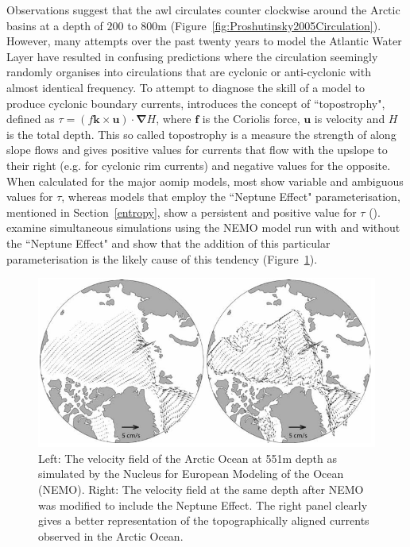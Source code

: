 \documentclass[12pt,a4paper]{report}
\newcommand*\figref[1]{Figure~\ref{#1}}
\newcommand*\secref[1]{Section~\ref{#1}}
\begin{document}
Observations suggest that the \gls{awl} circulates counter clockwise around the
 Arctic basins at a depth of $200$ to $800\mathrm{m}$
 (\figref{fig:Proshutinsky2005Circulation}). However, many attempts over the past twenty
 years to model the Atlantic Water Layer have resulted in confusing predictions where the
 circulation seemingly randomly organises into circulations that are cyclonic or
 anti-cyclonic with almost identical frequency. To attempt to diagnose the skill of a model
 to produce cyclonic boundary currents, \cite{holloway2007water} introduces the concept of ``topostrophy",
 defined as   $\tau=(f\boldsymbol{k}\times\boldsymbol{u})\cdot\boldsymbol{\nabla}H$, where
 $\boldsymbol{f}$  is the Coriolis force,  $\boldsymbol{u}$ is velocity and  $H$ is the total depth. 
 This so called topostrophy is a measure the strength of along slope flows and gives
 positive values for currents that flow with the upslope to their right (e.g. for cyclonic
 rim currents) and negative values for the opposite.  When calculated for the major
 \gls{aomip} models, most show variable and ambiguous values for $\tau$,  whereas models that
 employ the ``Neptune Effect" parameterisation, mentioned in \secref{entropy}, show a persistent and positive
 value for  $\tau$ (\cite{proshutinsky2011recent}). \cite{holloway2009representing} examine
 simultaneous simulations using the NEMO model run with and without the ``Neptune Effect" and
 show that the addition of this particular parameterisation is the likely cause of this
 tendency (\figref{fig:HolloWang2009}).  


\begin{figure}
	\centering
	\includegraphics[width=\linewidth]{HolloWang2009}
	\caption[\cite{holloway2009representing}]{Left: The velocity field of the Arctic Ocean at 551m depth as simulated by the Nucleus for European Modeling of the Ocean (NEMO). Right: The velocity field at the same depth after NEMO was modified to include the Neptune Effect. The right panel clearly gives a better representation of the topographically aligned currents observed in the Arctic Ocean.  \cite{holloway2009representing}}
	\label{fig:HolloWang2009}
\end{figure}
\end{document}
